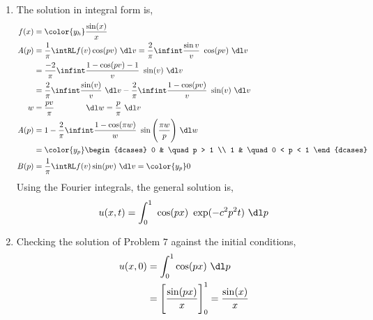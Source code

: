 \begin{enumerate}
    \item The solution in integral form is,
          \begin{align}
              f(x) & = \color{y_h} \frac{\sin(x)}{x}                                  \\
              A(p) & = \frac{1}{\pi} \intRL f(v) \cos(pv)\ \dl v
              = \frac{2}{\pi} \infint \frac{\sin v}{v}\ \cos(pv)\ \dl v               \\
                   & = \frac{-2}{\pi} \infint \frac{1 - \cos(pv) - 1}{v}\ \sin(v)
              \ \dl v                                                                 \\
                   & = \frac{2}{\pi} \infint \frac{\sin(v)}{v}\ \dl v - \frac{2}{\pi}
              \infint  \frac{1 - \cos(pv)}{v}\ \sin(v)\ \dl v                         \\
              w    & = \frac{p v}{\pi} \qquad\qquad \dl w = \frac{p}{\pi}\ \dl v      \\
              A(p) & = 1 - \frac{2}{\pi} \infint \frac{1 - \cos(\pi w)}{w}
              \ \sin\Bigg( \frac{\pi w}{p} \Bigg)\ \dl w                              \\
                   & = \color{y_p} \begin{dcases}
                                       0 & \quad p > 1     \\
                                       1 & \quad 0 < p < 1
                                   \end{dcases}                                \\
              B(p) & = \frac{1}{\pi} \intRL f(v) \sin(pv)\ \dl v
              = \color{y_p} 0
          \end{align}
          Using the Fourier integrals, the general solution is,
          \begin{align}
              u(x, t) = \int_{0}^{1}\ \cos(px)\ \exp(-c^2p^2 t)\ \dl p
          \end{align}

    \item Checking the solution of Problem $ 7 $ against the initial conditions,
          \begin{align}
              u(x, 0) & = \int_{0}^{1} \cos(px)\ \dl p                             \\
                      & = \Bigg[ \frac{\sin(px)}{x} \Bigg]_0^1 = \frac{\sin(x)}{x}
          \end{align}


\end{enumerate}
